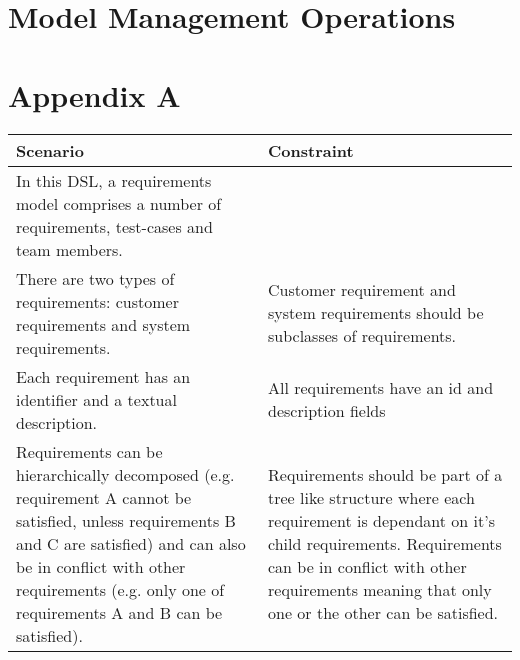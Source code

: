 \documentclass[11pt,a4paper]{scrartcl}
\begin{document}
\section{Model Management Operations}

\pagebreak
\appendix
\section{Appendix A}
\begin{center}
	\begin{longtable}{| p{0.5\linewidth} | p{0.5\linewidth} |}
		\hline
		\textbf{Scenario} & \textbf{Constraint} \\ \hline
		
		In this DSL, a requirements model comprises a number of requirements, test-cases and team members. 
		& \\ \hline
		
		There are two types of requirements: customer requirements and system requirements. 
		& Customer requirement and system requirements should be subclasses of requirements. \\ \hline
		
		Each requirement has an identifier and a textual description.
		& All requirements have an id and description fields \\ \hline
		
		Requirements can be hierarchically decomposed (e.g. requirement A cannot be satisfied, unless requirements B and C are satisfied) and can also be in conflict with other requirements (e.g. only one of requirements A and B can be satisfied). 
		& Requirements should be part of a tree like structure where each requirement is dependant on it's child requirements. Requirements can be in conflict with other requirements meaning that only one or the other can be satisfied. \\ \hline
		

\end{longtable}
\end{center}
\end{document}
